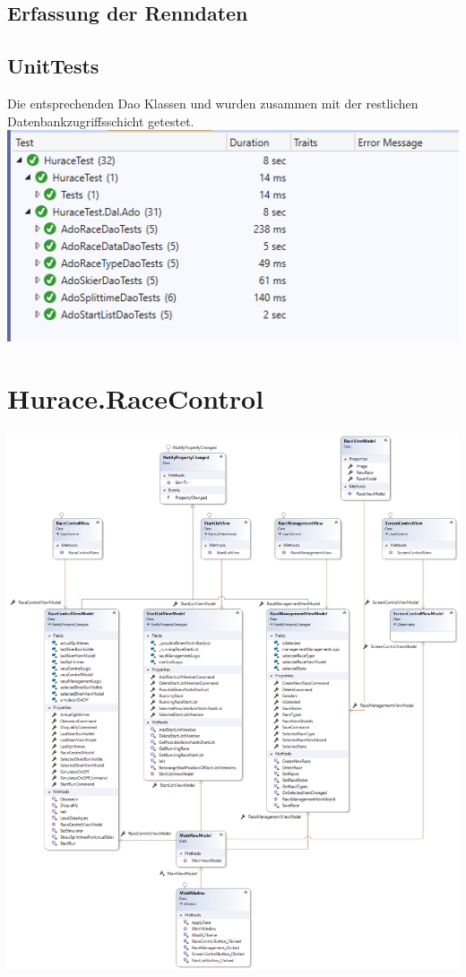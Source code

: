 \documentclass[a4paper, 12pt]{article}
\begin{document}
	\subsection{Erfassung der Renndaten}
	\subsection{UnitTests}
	Die entsprechenden Dao Klassen und wurden zusammen mit der restlichen Datenbankzugriffsschicht getestet. 
	\newline
	\newline
	\includegraphics[width=.7\textwidth]{img/UnitTests.png}
	
	\section{Hurace.RaceControl}
	\includegraphics[width=.9\textwidth]{img/RaceControl.png}
\end{document}
